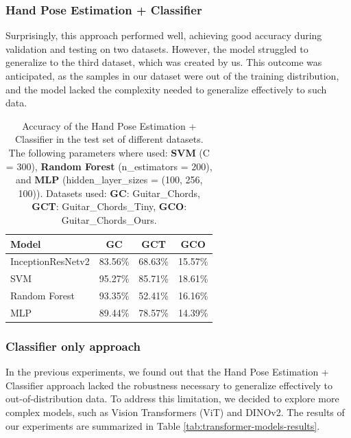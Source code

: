 \documentclass[10pt,twocolumn,letterpaper]{article}
\begin{document}
\subsubsection{Hand Pose Estimation + Classifier}
Surprisingly, this approach performed well, achieving good accuracy during validation and testing on two datasets. However, the model struggled to generalize to the third dataset, which was created by us. This outcome was anticipated, as the samples in our dataset were out of the training distribution, and the model lacked the complexity needed to generalize effectively to such data.

\begin{table}[h]
    \centering
    \begin{tabular}{lccc}
        \toprule
        \textbf{Model}    & \textbf{GC} & \textbf{GCT} & \textbf{GCO} \\
        \midrule
        InceptionResNetv2 & 83.56\%     & 68.63\%      & 15.57\%      \\
        \midrule
        SVM            & 95.27\%     & 85.71\%      & 18.61\%      \\
        Random Forest   & 93.35\%     & 52.41\%      & 16.16\%      \\
        MLP & 89.44\%     & 78.57\%      & 14.39\%      \\
        \bottomrule
    \end{tabular}
    \caption{Accuracy of the Hand Pose Estimation + Classifier in the test set of different datasets. The following parameters where used: \textbf{SVM} (C = 300), \textbf{Random Forest} (n\_estimators = 200), and \textbf{MLP} (hidden\_layer\_sizes = (100, 256, 100)). Datasets used: \textbf{GC}: Guitar\_Chords, \textbf{GCT}: Guitar\_Chords\_Tiny, \textbf{GCO}: Guitar\_Chords\_Ours.}
    \label{tab:handpose-classifier-results}
\end{table}

\subsubsection{Classifier only approach}
In the previous experiments, we found out that the Hand Pose Estimation + Classifier approach lacked the robustness necessary to generalize effectively to out-of-distribution data. To address this limitation, we decided to explore more complex models, such as Vision Transformers (ViT) and DINOv2. The results of our experiments are summarized in Table \ref{tab:transformer-models-results}.
\end{document}
